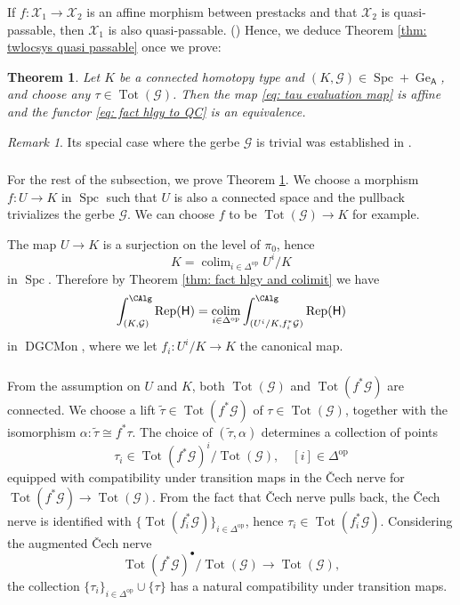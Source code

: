 \documentclass[10pt]{amsart}
\newcommand{\sssec}{\subsubsection}
\newtheorem{thm}[subsubsection]{Theorem}
\theoremstyle{remark}
\newtheorem{rmk}[subsubsection]{Remark}
\newcommand{\wt}{\widetilde}
\newcommand{\on}{\operatorname}
\newcommand{\cG}{\mathcal{G}}
\newcommand{\cX}{\mathcal{X}}
\newcommand{\DGCatSymMon}{\on{DGCMon}}
\newcommand{\Rep}{\on{Rep}}
\newcommand{\Spc}{\on{Spc}}
\DeclareMathOperator{\op}{op}
\DeclareMathOperator{\colim}{colim}
\newcommand{\sffH}{\mathsf{H}}
\newcommand{\sfA}{\mathsf{A}}
\begin{document}
If $f: \cX_1\rightarrow \cX_2$ is an affine morphism between prestacks and that $\cX_2$ is quasi-passable, then $\cX_1$ is also quasi-passable. (\cite[Lemma 1.6.2]{GKRV}) Hence, we deduce Theorem \ref{thm: twlocsys quasi passable} once we prove:
\begin{thm}\label{thm: twlocsys affine}
    Let $K$ be a connected homotopy type and $(K,\cG)\in \Spc+\on{Ge}_{\sfA}$, and choose any $\tau\in \on{Tot}(\cG)$.
    Then the map \eqref{eq: tau evaluation map}   
    is affine and the functor \eqref{eq: fact hlgy to QC} is an equivalence.
\end{thm}

\begin{rmk}\label{rmk: twlocsys affine when trivial}
    Its special case where the gerbe $\cG$ is trivial was established in \cite[Theorem 1.6.8]{GKRV}.
\end{rmk}

\sssec{}
For the rest of the subsection, we prove Theorem \ref{thm: twlocsys affine}.  We choose a morphism $f:U\rightarrow K$ in $\Spc$ such that $U$ is also a connected space and the pullback trivializes the gerbe $\cG$. We can choose $f$ to be $\on{Tot}(\cG)\rightarrow K$ for example.
\medskip

The map $U\rightarrow K$ is a surjection on the level of $\pi_0$, hence
\begin{equation}\label{eq: eff epi in Spc}
    K=\colim_{i\in \Delta^{\op}}U^i/K
\end{equation}
in $\Spc$. Therefore by Theorem \ref{thm: fact hlgy and colimit} we have
\begin{equation}\label{eq: colimit of twfact}
    \int^{\CAlg}_{(K,\cG)}\Rep(\sffH)=\colim_{i\in\Delta^{\op}}\int^{\CAlg}_{(U^i/K,f^*_i\cG)}\Rep(\sffH)
\end{equation}
in $\DGCatSymMon$, where we let $f_i:U^i/K\rightarrow K$ the canonical map.


\sssec{}\label{sssec: lifting tau}
From the assumption on $U$ and $K$, both $\on{Tot}(\cG)$ and $\on{Tot}(f^*\cG)$ are connected. We choose a lift $\wt{\tau}\in \on{Tot}(f^*\cG)$ of $\tau\in\on{Tot}(\cG)$, together with the isomorphism $\alpha:\wt{\tau}\cong f^*\tau$. The choice of  $(\wt{\tau},\alpha)$ determines a collection of points
\[\tau_i\in \on{Tot}(f^*\cG)^i/\on{Tot}(\cG),\quad [i]\in \Delta^{\op}\]
equipped with compatibility under transition maps in the \v{C}ech nerve for $\on{Tot}(f^*\cG)\rightarrow \on{Tot}(\cG)$. From the fact that \v{C}ech nerve pulls back, the \v{C}ech nerve is identified with $\{\on{Tot}(f^*_i\cG)\}_{i\in\Delta^{\op}}$, hence $\tau_i\in \on{Tot}(f^*_i\cG)$. Considering the augmented \v{C}ech nerve
\[\on{Tot}(f^*\cG)^{\bullet}/\on{Tot}(\cG)\rightarrow \on{Tot}(\cG),\]
the collection $\{\tau_i\}_{i\in\Delta^{\op}}\cup\{\tau\}$ has a natural compatibility under transition maps.
\end{document}
